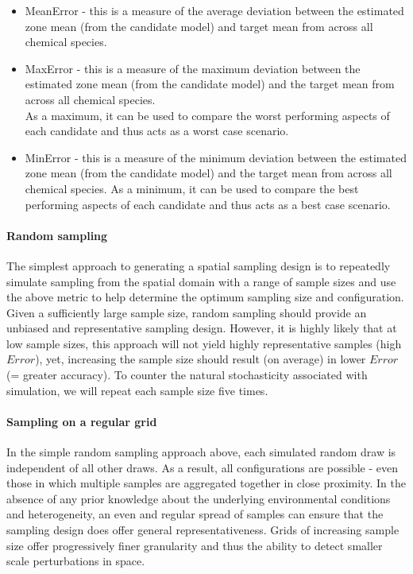 \documentclass[a4paper]{article}
\begin{document}
\begin{itemize}
\tightlist
\item
  MeanError - this is a measure of the average deviation between the
  estimated zone mean (from the candidate model) and target mean from
  across all chemical species.
\item
  MaxError - this is a measure of the maximum deviation between the
  estimated zone mean (from the candidate model) and the target mean
  from across all chemical species.\\
  As a maximum, it can be used to compare the worst performing aspects
  of each candidate and thus acts as a worst case scenario.
\item
  MinError - this is a measure of the minimum deviation between the
  estimated zone mean (from the candidate model) and the target mean
  from across all chemical species. As a minimum, it can be used to
  compare the best performing aspects of each candidate and thus acts as
  a best case scenario.
\end{itemize}

\hypertarget{random-sampling-1}{%
\paragraph{Random sampling}\label{random-sampling-1}}

The simplest approach to generating a spatial sampling design is to
repeatedly simulate sampling from the spatial domain with a range of
sample sizes and use the above metric to help determine the optimum
sampling size and configuration. Given a sufficiently large sample size,
random sampling should provide an unbiased and representative sampling
design. However, it is highly likely that at low sample sizes, this
approach will not yield highly representative samples (high \(Error\)),
yet, increasing the sample size should result (on average) in lower
\(Error\) (= greater accuracy). To counter the natural stochasticity
associated with simulation, we will repeat each sample size five times.

\hypertarget{sampling-on-a-regular-grid-1}{%
\paragraph{Sampling on a regular
grid}\label{sampling-on-a-regular-grid-1}}

In the simple random sampling approach above, each simulated random draw
is independent of all other draws. As a result, all configurations are
possible - even those in which multiple samples are aggregated together
in close proximity. In the absence of any prior knowledge about the
underlying environmental conditions and heterogeneity, an even and
regular spread of samples can ensure that the sampling design does offer
general representativeness. Grids of increasing sample size offer
progressively finer granularity and thus the ability to detect smaller
scale perturbations in space.
\end{document}
